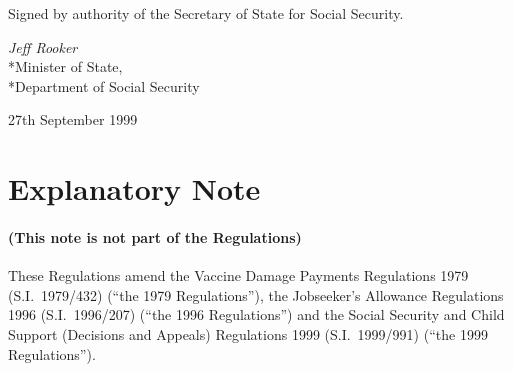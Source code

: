 \documentclass[12pt,a4paper]{article}
\begin{document}

%
%
%

\bigskip

Signed 
by authority of the Secretary of State for Social Security.

{\raggedleft
\emph{Jeff Rooker
}\\*Minister of State,\\*Department of Social Security

}

27th September 1999

\small

\part{Explanatory Note}

\renewcommand\parthead{--- Explanatory Note}

\subsection*{(This note is not part of the Regulations)}

These Regulations amend the Vaccine Damage Payments Regulations 1979 (S.I.\ 1979/432) (“the 1979 Regulations”), the Jobseeker’s Allowance Regulations 1996 (S.I.\ 1996/207) (“the 1996 Regulations”) and the Social Security and Child Support (Decisions and Appeals) Regulations 1999 (S.I.\ 1999/991) (“the 1999 Regulations”).
\end{document}
